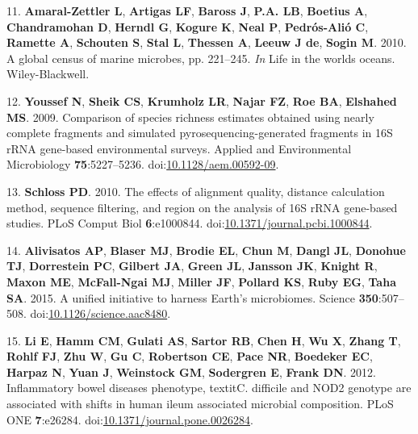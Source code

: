 \documentclass[11pt,]{article}
\begin{document}
\hypertarget{ref-AmaralZettler2010}{}
11. \textbf{Amaral-Zettler L}, \textbf{Artigas LF}, \textbf{Baross J},
\textbf{P.A. LB}, \textbf{Boetius A}, \textbf{Chandramohan D},
\textbf{Herndl G}, \textbf{Kogure K}, \textbf{Neal P},
\textbf{Pedrós-Alió C}, \textbf{Ramette A}, \textbf{Schouten S},
\textbf{Stal L}, \textbf{Thessen A}, \textbf{Leeuw J de}, \textbf{Sogin
M}. 2010. A global census of marine microbes, pp. 221--245. \emph{In}
Life in the worlds oceans. Wiley-Blackwell.

\hypertarget{ref-Youssef2009}{}
12. \textbf{Youssef N}, \textbf{Sheik CS}, \textbf{Krumholz LR},
\textbf{Najar FZ}, \textbf{Roe BA}, \textbf{Elshahed MS}. 2009.
Comparison of species richness estimates obtained using nearly complete
fragments and simulated pyrosequencing-generated fragments in 16S rRNA
gene-based environmental surveys. Applied and Environmental Microbiology
\textbf{75}:5227--5236.
doi:\href{https://doi.org/10.1128/aem.00592-09}{10.1128/aem.00592-09}.

\hypertarget{ref-Schloss2010}{}
13. \textbf{Schloss PD}. 2010. The effects of alignment quality,
distance calculation method, sequence filtering, and region on the
analysis of 16S rRNA gene-based studies. PLoS Comput Biol
\textbf{6}:e1000844.
doi:\href{https://doi.org/10.1371/journal.pcbi.1000844}{10.1371/journal.pcbi.1000844}.

\hypertarget{ref-Alivisatos2015}{}
14. \textbf{Alivisatos AP}, \textbf{Blaser MJ}, \textbf{Brodie EL},
\textbf{Chun M}, \textbf{Dangl JL}, \textbf{Donohue TJ},
\textbf{Dorrestein PC}, \textbf{Gilbert JA}, \textbf{Green JL},
\textbf{Jansson JK}, \textbf{Knight R}, \textbf{Maxon ME},
\textbf{McFall-Ngai MJ}, \textbf{Miller JF}, \textbf{Pollard KS},
\textbf{Ruby EG}, \textbf{Taha SA}. 2015. A unified initiative to
harness Earth's microbiomes. Science \textbf{350}:507--508.
doi:\href{https://doi.org/10.1126/science.aac8480}{10.1126/science.aac8480}.

\hypertarget{ref-Liux5f2012}{}
15. \textbf{Li E}, \textbf{Hamm CM}, \textbf{Gulati AS}, \textbf{Sartor
RB}, \textbf{Chen H}, \textbf{Wu X}, \textbf{Zhang T}, \textbf{Rohlf
FJ}, \textbf{Zhu W}, \textbf{Gu C}, \textbf{Robertson CE}, \textbf{Pace
NR}, \textbf{Boedeker EC}, \textbf{Harpaz N}, \textbf{Yuan J},
\textbf{Weinstock GM}, \textbf{Sodergren E}, \textbf{Frank DN}. 2012.
Inflammatory bowel diseases phenotype, textitC. difficile and NOD2
genotype are associated with shifts in human ileum associated microbial
composition. PLoS ONE \textbf{7}:e26284.
doi:\href{https://doi.org/10.1371/journal.pone.0026284}{10.1371/journal.pone.0026284}.
\end{document}

